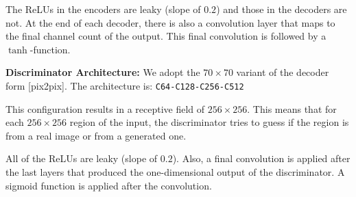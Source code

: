 \documentclass{llncs}
\begin{document}
\begin{subappendices}
The ReLUs in the encoders are leaky (slope of $0.2$) and those in the decoders are not. At the end of each decoder, there is also a convolution layer that maps to the final channel count of the output. This final convolution is followed by a $\tanh$-function.

\noindent\textbf{Discriminator Architecture:}
We adopt the $70\times70$ variant of the decoder form [pix2pix]. The architecture is:\newline
\texttt{C64-C128-C256-C512}

This configuration results in a receptive field of $256\times256$. This means that for each $256\times256$ region of the input, the discriminator tries to guess if the region is from a real image or from a generated one.

All of the ReLUs are leaky (slope of $0.2$). Also, a final convolution is applied after the last layers that produced the one-dimensional output of the discriminator. A sigmoid function is applied after the convolution.
\end{subappendices}
\end{document}
